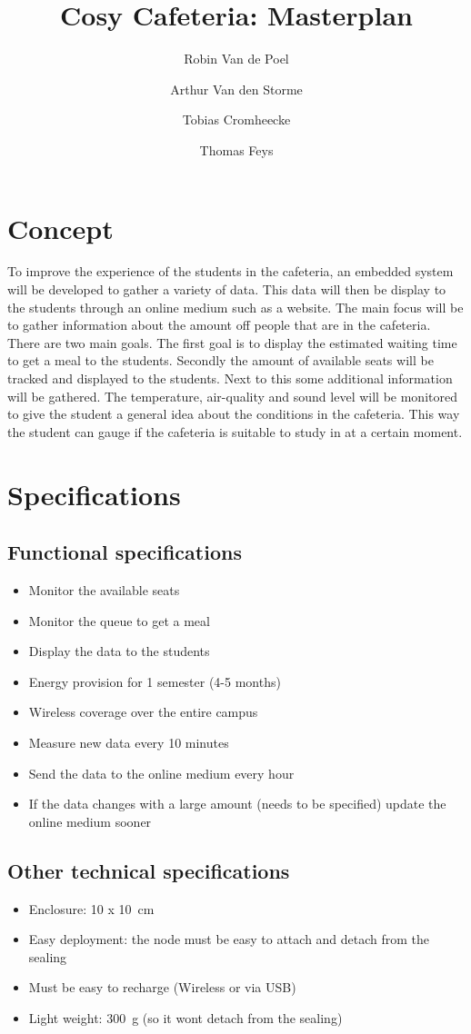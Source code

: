 \documentclass[]{article}
\title{Cosy Cafeteria: Masterplan}
\author{ Robin Van de Poel\and Arthur Van den Storme\and Tobias Cromheecke\and Thomas Feys 
}
\begin{document}
	\maketitle
	
	\section{Concept}
	To improve the experience of the students in the cafeteria, an embedded system will be developed to gather a variety of data. This data will then be display to the students through an online medium such as a website. The main focus will be to gather information about the amount off people that are in the cafeteria. There are two main goals. The first goal is to display the estimated waiting time to get a meal to the students. Secondly the amount of available seats will be tracked and displayed to the students. Next to this some additional information will be gathered. The temperature, air-quality and sound level will be monitored to give the student a general idea about the conditions in the cafeteria. This way the student can gauge if the cafeteria is suitable to study in at a certain moment. 

	\section{Specifications}
	\subsection{Functional specifications}
	\begin{itemize}
		\item Monitor the available seats
		\item Monitor the queue to get a meal
		\item Display the data to the students
		\item Energy provision for 1 semester (4-5 months)
		\item Wireless coverage over the entire campus
		\item Measure new data every 10 minutes
		\item Send the data to the online medium every hour 
		\item If the data changes with a large amount (needs to be specified) update the online medium sooner
	\end{itemize}

	\subsection{Other technical specifications}
	\begin{itemize}
		\item Enclosure: 10 x \SI{10}{\centi\meter}
		\item Easy deployment: the node must be easy to attach and detach from the sealing
		\item Must be easy to recharge (Wireless or via USB)
		\item Light weight: \SI{300}{\gram} (so it wont detach from the sealing)
	\end{itemize}
	
\end{document}
